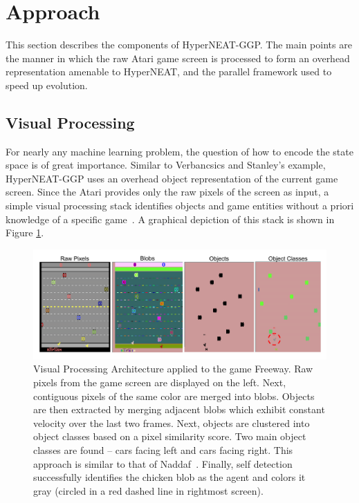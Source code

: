 \documentclass{acm_proc_article-sp}
\begin{document}
\section{Approach}
\label{sec:approach}
This section describes the components of HyperNEAT-GGP. The main points are the manner in which the raw Atari game screen is processed to form an overhead representation amenable to HyperNEAT, and the parallel framework used to speed up evolution.

\subsection{Visual Processing}
For nearly any machine learning problem, the question of how to encode the state space is of great importance. Similar to Verbancsics and Stanley's example, HyperNEAT-GGP uses an overhead object representation of the current game screen. Since the Atari provides only the raw pixels of the screen as input, a simple visual processing stack identifies objects and game entities without a priori knowledge of a specific game~\cite{naddaf10}. A graphical depiction of this stack is shown in Figure \ref{fig:visproc}.

\begin{figure}[htp]
\begin{center}
\includegraphics[width=\textwidth]{figures/AtariArch}
\end{center}
\caption{Visual Processing Architecture applied to the game Freeway. Raw pixels from the game screen are displayed on the left. Next, contiguous pixels of the same color are merged into blobs. Objects are then extracted by merging adjacent blobs which exhibit constant velocity over the last two frames. Next, objects are clustered into object classes based on a pixel similarity score. Two main object classes are found -- cars facing left and cars facing right. This approach is similar to that of Naddaf~\cite{naddaf10}. Finally, self detection successfully identifies the chicken blob as the agent and colors it gray (circled in a red dashed line in rightmost screen).}
\label{fig:visproc}
\end{figure}
\end{document}
